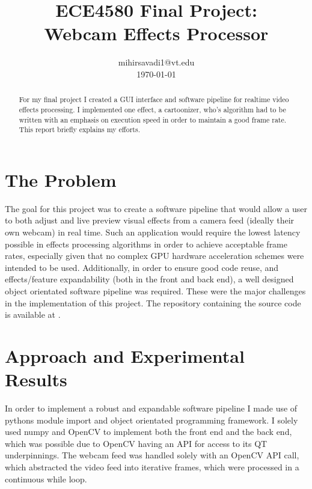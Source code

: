 \documentclass[conference]{IEEEtran}
\title{ECE4580 Final Project: \\ Webcam Effects Processor \\\vspace*{20pt}}
\author{\IEEEauthorblockN{Mihir Savadi} mihirsavadi1@vt.edu \\ \today}
\begin{document}
    \maketitle
    \IEEEpubid{\today{}\space(\currenttime)}

    \thispagestyle{plain}
    \pagestyle{plain}

    \begin{abstract}
        For my final project I created a GUI interface and software pipeline for realtime video effects processing. I
        implemented one effect, a cartoonizer, who's algorithm had to be written with an emphasis on execution speed in
        order to maintain a good frame rate. This report briefly explains my efforts.
    \end{abstract}


    \section{The Problem}

        The goal for this project was to create a software pipeline that would allow a user to both adjust and live
        preview visual effects from a camera feed (ideally their own webcam) in real time. Such an application would
        require the lowest latency possible in effects processing algorithms in order to achieve acceptable frame rates,
        especially given that no complex GPU hardware acceleration schemes were intended to be used. Additionally, in
        order to ensure good code reuse, and effects/feature expandability (both in the front and back end), a well
        designed object orientated software pipeline was required. These were the major challenges in the implementation
        of this project. The repository containing the source code is available at \cite{repo}.

    \section{Approach and Experimental Results}
        
        In order to implement a robust and expandable software pipeline I made use of pythons module import and object
        orientated programming framework. I solely used numpy and OpenCV to implement both the front end and the back
        end, which was possible due to OpenCV having an API for access to its QT underpinnings. The webcam feed was
        handled solely with an OpenCV API call, which abstracted the video feed into iterative frames, which were
        processed in a continuous while loop. 
\end{document}
